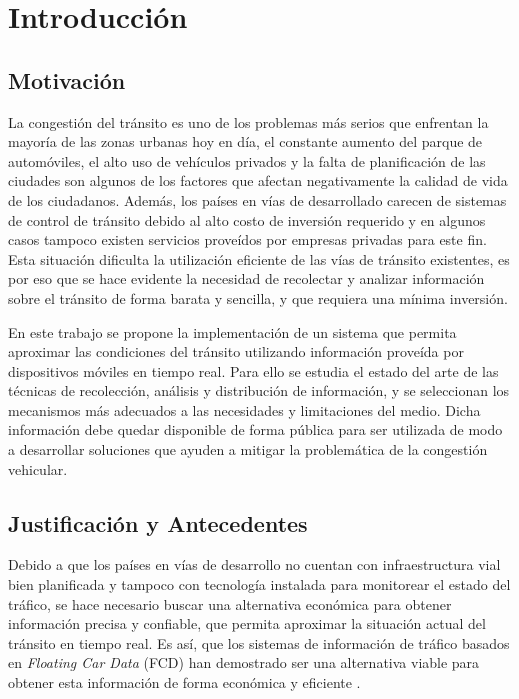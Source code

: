 \chapter{Introducción}
\label{cap:1}

\section{Motivación}

La congestión del tránsito es uno de los problemas más serios que enfrentan la mayoría de las zonas urbanas hoy en día, el constante aumento del parque de automóviles, el alto uso de vehículos privados y la falta de planificación de las ciudades son algunos de los factores que afectan negativamente la calidad de vida de los ciudadanos. Además, los países en vías de desarrollado carecen de sistemas de control de tránsito debido al alto costo de inversión requerido y en algunos casos tampoco existen servicios proveídos por empresas privadas para este fin. Esta situación dificulta la utilización eficiente de las vías de tránsito existentes, es por eso que se hace evidente la necesidad de recolectar y analizar información sobre el tránsito de forma barata y sencilla, y que requiera una mínima inversión.

En este trabajo se propone la implementación de un sistema que permita aproximar las condiciones del tránsito utilizando información proveída por dispositivos móviles en tiempo real. Para ello se estudia el estado del arte de las técnicas de recolección, análisis y distribución de información, y se seleccionan los mecanismos más adecuados a las necesidades y limitaciones del medio. Dicha información debe quedar disponible de forma pública para ser utilizada de modo a desarrollar soluciones que ayuden a mitigar la problemática de la congestión vehicular.

\section{Justificación y Antecedentes}

Debido a que los países en vías de desarrollo no cuentan con infraestructura vial bien planificada y  tampoco con tecnología instalada para monitorear el estado del tráfico, se hace necesario buscar una alternativa económica para obtener información precisa y confiable, que permita aproximar la situación actual del tránsito en tiempo real. Es así, que los sistemas de información de tráfico basados en \emph{Floating Car Data} (FCD) han demostrado ser una alternativa viable para obtener esta información de forma económica y eficiente \citep{schafer2002traffic,reinthaler2007evaluation}.

